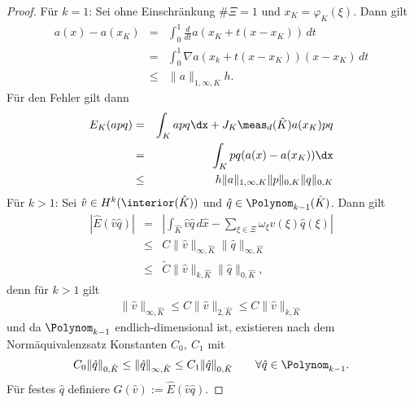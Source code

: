 \begin{proof}
    Für $k = 1$:
    Sei ohne Einschränkung $\#\varXi = 1$ und $x_K = \varphi_K(\xi)$.
    Dann gilt
    \begin{eqnarray*}
            a(x) - a(x_K)
        &=& \int_0^1 \frac{d}{dt} a(x_K + t(x - x_K)) \,dt \\
        &=& \int_0^1 \nabla a(x_k + t(x - x_K)) (x - x_K) \,dt \\
        &\le& \|a\|_{1,\infty,K} h.
    \end{eqnarray*}
    Für den Fehler gilt dann
    \begin{eqnarray*}
            E_K(apq)
        &=& \int_K apq \dx + J_K \meas_d(\hat K) a(x_K) pq \\
        &=& \int_K pq (a(x) - a(x_K)) \dx \\
        &\le& h \|a\|_{1,\infty,K} \|p\|_{0,K} \|q\|_{0,K} \\
    \end{eqnarray*}
    Für $k > 1$:
    Sei $\hat v\in H^k(\interior(\hat K))$ und
    $\hat q\in \Polynom_{k-1}(\hat K)$.
    Dann gilt
    \begin{eqnarray*}
            |\hat E(\hat v \hat q)|
        &=& \left|\int_{\hat K} \hat v \hat q \,d\hat x - \sum_{\xi\in \varXi}
            \omega_\xi \hat v(\xi) \hat q(\xi)\right| \\
        &\le& C \|\hat v\|_{\infty,\hat K} \|\hat q\|_{\infty,\hat K} \\
        &\le& \tilde C \|\hat v\|_{k,\hat K} \|\hat q\|_{0,\hat K},
    \end{eqnarray*}
    denn für $k > 1$ gilt
    \begin{eqnarray*}
            \|\hat v\|_{\infty,\hat K}
        \le C \|\hat v\|_{2,\hat K}
        \le C \|\hat v\|_{k,\hat K}
    \end{eqnarray*}
    und da $\Polynom_{k-1}$ endlich-dimensional ist, existieren nach dem
    Normäquivalenzsatz Konstanten $C_0, \ C_1$  mit
    \begin{eqnarray*}
            C_0 \|\hat q\|_{0,\hat K}
        \le \|\hat q\|_{\infty,\hat K}
        \le C_1 \|\hat q\|_{0,\hat K}
        \qquad \forall \hat q\in \Polynom_{k-1}.
    \end{eqnarray*}
    Für festes $\hat q$ definiere $G(\hat v) := \hat E(\hat v \hat q)$.


\end{proof}
